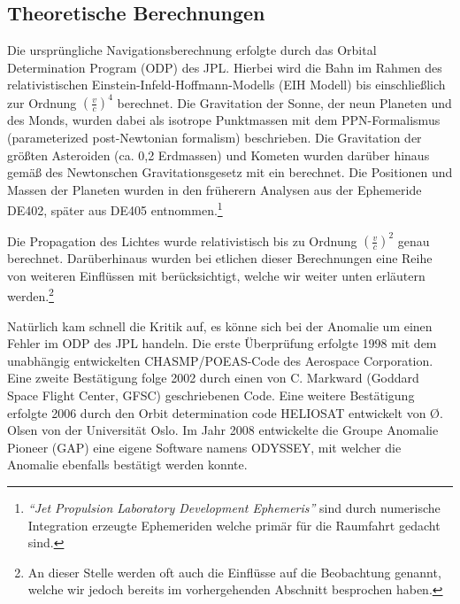 
\subsection{Theoretische Berechnungen}
Die ursprüngliche Navigationsberechnung erfolgte durch das Orbital Determination Program (ODP) des JPL.
Hierbei wird die Bahn im Rahmen des relativistischen Einstein-Infeld-Hoffmann-Modells (EIH Modell)
bis einschließlich zur Ordnung $(\frac{v}{c})^4$ berechnet.
Die Gravitation der Sonne, der neun Planeten und des Monds, wurden dabei als isotrope Punktmassen mit dem
PPN-Formalismus (parameterized post-Newtonian formalism) beschrieben\cite{Anderson2002}. Die Gravitation der größten
Asteroiden (ca. 0,2 Erdmassen) und Kometen wurden darüber hinaus gemäß des Newtonschen Gravitationsgesetz mit
ein berechnet. Die Positionen und Massen der Planeten wurden in den früherern Analysen aus der Ephemeride
DE402, später aus DE405 entnommen.\footnote{\textit{``Jet Propulsion Laboratory Development Ephemeris''} sind durch
numerische Integration erzeugte Ephemeriden welche primär für die Raumfahrt gedacht sind.}\cite{Anderson2002}

Die Propagation des Lichtes wurde relativistisch bis zu Ordnung $(\frac{v}{c})^2$ genau berechnet.
Darüberhinaus wurden bei etlichen dieser Berechnungen eine Reihe von weiteren Einflüssen mit berücksichtigt, welche wir
weiter unten %
erläutern werden.\footnote{An dieser Stelle werden oft auch die Einflüsse auf die Beobachtung genannt, welche wir jedoch
bereits im vorhergehenden Abschnitt besprochen haben.}

Natürlich kam schnell die Kritik auf, es könne sich bei der Anomalie um einen Fehler im ODP des JPL handeln.
Die erste Überprüfung erfolgte 1998 mit dem unabhängig entwickelten CHASMP/POEAS-Code des Aerospace
Corporation.
Eine zweite Bestätigung folge 2002 durch einen von C. Markward (Goddard Space Flight Center, GFSC) geschriebenen
Code.
Eine weitere Bestätigung erfolgte 2006 durch den Orbit determination code HELIOSAT entwickelt von Ø. Olsen von der
Universität Oslo.
Im Jahr 2008 entwickelte die Groupe Anomalie Pioneer (GAP) eine eigene Software namens ODYSSEY,
mit welcher die Anomalie ebenfalls bestätigt werden konnte.

